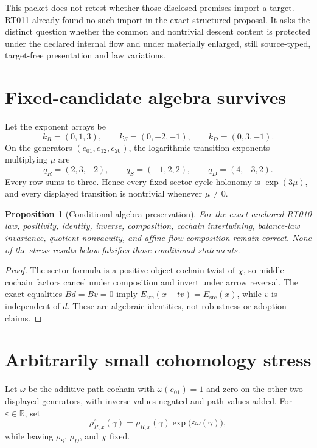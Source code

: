 \documentclass[11pt]{article}
\newtheorem{proposition}{Proposition}
\newcommand{\R}{\mathbb{R}}
\begin{document}
This packet does not retest whether those disclosed premises import a target.
RT011 already found no such import in the exact structured proposal.  It asks
the distinct question whether the common and nontrivial descent content is
protected under the declared internal flow and under materially enlarged,
still source-typed, target-free presentation and law variations.

\section{Fixed-candidate algebra survives}

Let the exponent arrays be
\[
k_R=(0,1,3),\qquad k_S=(0,-2,-1),\qquad k_D=(0,3,-1).
\]
On the generators $(e_{01},e_{12},e_{20})$, the logarithmic transition
exponents multiplying $\mu$ are
\[
 q_R=(2,3,-2),\qquad q_S=(-1,2,2),\qquad q_D=(4,-3,2).
\]
Every row sums to three.  Hence every fixed sector cycle holonomy is
$\exp(3\mu)$, and every displayed transition is nontrivial whenever
$\mu\ne0$.

\begin{proposition}[Conditional algebra preservation]
For the exact anchored RT010 law, positivity, identity, inverse, composition,
cochain intertwining, balance-law invariance, quotient nonvacuity, and affine
flow composition remain correct.  None of the stress results below falsifies
those conditional statements.
\end{proposition}

\begin{proof}
The sector formula is a positive object-cochain twist of $\chi$, so middle
cochain factors cancel under composition and invert under arrow reversal.
The exact equalities $Bd=Bv=0$ imply
$E_{\mathrm{src}}(x+tv)=E_{\mathrm{src}}(x)$, while $v$ is independent of
$d$.  These are algebraic identities, not robustness or adoption claims.
\end{proof}

\section{Arbitrarily small cohomology stress}

Let $\omega$ be the additive path cochain with
$\omega(e_{01})=1$ and zero on the other two displayed generators, with inverse
values negated and path values added.  For $\varepsilon\in\R$, set
\[
 \rho^{\varepsilon}_{R,x}(\gamma)
 =\rho_{R,x}(\gamma)\exp\!\bigl(\varepsilon\omega(\gamma)\bigr),
\]
while leaving $\rho_S$, $\rho_D$, and $\chi$ fixed.
\end{document}
